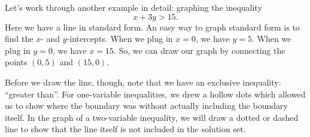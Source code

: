 %
%

Let's work through another example in detail: graphing the inequality
\[x + 3y > 15.\]
Here we have a line in standard form. An easy way to graph standard form is to find the $x$- and $y$-intercepts. When we plug in $x=0$, we have $y = 5$. When we plug in $y=0$, we have $x = 15$. So, we can draw our graph by connecting the points $(0, 5)$ and $(15, 0)$.

Before we draw the line, though, note that we have an exclusive inequality: ``greater than''. For one-variable inequalities, we drew a hollow dots which allowed us to show where the boundary was without actually including the boundary itself. In the graph of a two-variable inequality, we will draw a dotted or dashed line to show that the line itself is not included in the solution set.

